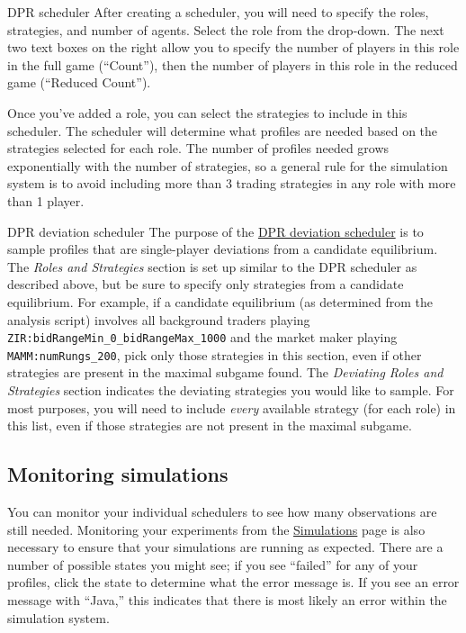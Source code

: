 \documentclass[11pt]{article}
\begin{document}
\begin{paragraph}{DPR scheduler}
After creating a scheduler, you will need to specify the roles, strategies, and number of agents. Select the role from the drop-down. The next two text boxes on the right allow you to specify the number of players in this role in the full game (``Count''), then the number of players in this role in the reduced game (``Reduced Count''). 

Once you've added a role, you can select the strategies to include in this scheduler. The scheduler will determine what profiles are needed based on the strategies selected for each role.
The number of profiles needed grows exponentially with the number of strategies, so a general rule for the simulation system is to avoid including more than 3 trading strategies in any role with more than 1 player.
\end{paragraph}

\begin{paragraph}{DPR deviation scheduler}
The purpose of the \href{http://egtaonline.eecs.umich.edu/dpr_deviation_schedulers/new}{DPR deviation scheduler} is to sample profiles that are single-player deviations from a candidate equilibrium.
The \emph{Roles and Strategies} section is set up similar to the DPR scheduler as described above, but be sure to specify only strategies from a candidate equilibrium. For example, if a candidate equilibrium (as determined from the analysis script) involves all background traders playing \verb|ZIR:bidRangeMin_0_bidRangeMax_1000| and the market maker playing \verb|MAMM:numRungs_200|, pick only those strategies in this section, even if other strategies are present in the maximal subgame found.
The \emph{Deviating Roles and Strategies} section indicates the deviating strategies you would like to sample. For most purposes, you will need to include \emph{every} available strategy (for each role) in this list, even if those strategies are not present in the maximal subgame.
\end{paragraph}


\subsection{Monitoring simulations}
You can monitor your individual schedulers to see how many observations are still needed.
Monitoring your experiments from the \href{http://egtaonline.eecs.umich.edu/simulations}{Simulations} page is also necessary to ensure that your simulations are running as expected.
There are a number of possible states you might see; if you see ``failed'' for any of your profiles, click the state to determine what the error message is. If you see an error message with ``Java,'' this indicates that there is most likely an error within the simulation system.
\end{document}
